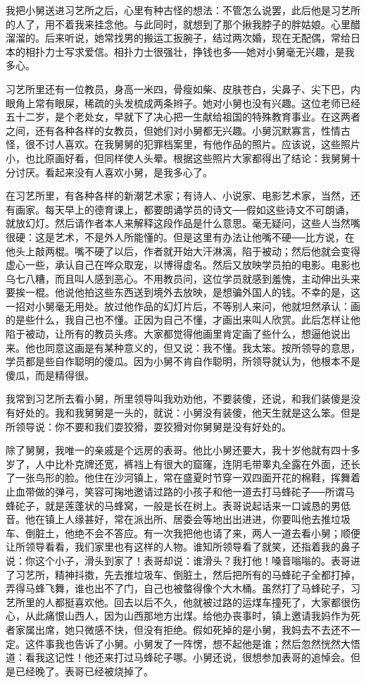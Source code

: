 我把小舅送进习艺所之后，心里有种古怪的想法：不管怎么说罢，此后他是习艺所的人了，用不着我来挂念他。与此同时，就想到了那个揪我脖子的胖姑娘。心里醋溜溜的。后来听说，她常找男的搬运工扳腕子，结过两次婚，现在无配偶，常给日本的相扑力士写求爱信。相扑力士很强壮，挣钱也多──她对小舅毫无兴趣，是我多心。 

习艺所里还有一位教员，身高一米四，骨瘦如柴、皮肤苍白，尖鼻子、尖下巴，内眼角上常有眼屎，稀疏的头发梳成两条辫子。她对小舅也没有兴趣。这位老师已经五十二岁，是个老处女，早就下了决心把一生献给祖国的特殊教育事业。在这两者之间，还有各种各样的女教员，但她们对小舅都无兴趣。小舅沉默寡言，性情古怪，很不讨人喜欢。在我舅舅的犯罪档案里，有他作品的照片。应该说，这些照片小，也比原画好看，但同样使人头晕。根据这些照片大家都得出了结论：我舅舅十分讨厌。看起来没有人喜欢小舅，是我多心了。 

在习艺所里，有各种各样的新潮艺术家；有诗人、小说家、电影艺术家，当然，还有画家。每天早上的德育课上，都要朗诵学员的诗文──假如这些诗文不可朗诵，就放幻灯。然后请作者本人来解释这段作品是什么意思。毫无疑问，这些人当然嘴很硬：这是艺术，不是外人所能懂的。但是这里有办法让他嘴不硬──比方说，在他头上敲两棍。嘴不硬了以后，作者就开始大汗淋漓，陷于被动；然后他就会变得虚心一些，承认自己在哗众取宠，以博得虚名。然后又放映学员拍的电影。电影也乌七八糟，而且叫人感到恶心。不用教员问，这位学员就感到羞愧，主动伸出头来要挨一棍。他说他拍这些东西送到境外去放映，是想骗外国人的钱。不幸的是，这一招对小舅毫无用处。放过他作品的幻灯片后，不等别人来问，他就坦然承认：画的是些什么，我自己也不懂。正因为自己不懂，才画出来叫人欣赏。此后怎样让他陷于被动，让所有的教员头疼。大家都觉得他画里肯定画了些什么，想逼他说出来。他也同意这画是有某种意义的，但又说：我不懂。我太笨。按所领导的意思，学员都是些自作聪明的傻瓜。因为小舅不肯自作聪明，所领导就认为，他根本不是傻瓜，而是精得很。 

我常到习艺所去看小舅，所里领导叫我劝劝他，不要装傻，还说，和我们装傻是没有好处的。我和我舅舅是一头的，就说：小舅没有装傻，他天生就是这么笨。但是所领导说：你不要和我们耍狡猾，耍狡猾对你舅舅是没有好处的。 

除了舅舅，我唯一的亲戚是个远房的表哥。他比小舅还要大，我十岁他就有四十多岁了，人中比朴克牌还宽，裤裆上有很大的窟窿，连阴毛带睾丸全露在外面，还长了一张鸟形的脸。他住在沙河镇上，常在盛夏时节穿一双四面开花的棉鞋，挥舞着止血带做的弹弓，笑容可掬地邀请过路的小孩子和他一道去打马蜂砣子──所谓马蜂砣子，就是莲蓬状的马蜂窝，一般是长在树上。表哥说起话来一口诚恳的男低音。他在镇上人缘甚好，常在派出所、居委会等地出出进进，你要叫他去推垃圾车、倒脏土，他绝不会不答应。有一次我把他也请了来，两人一道去看小舅；顺便让所领导看看，我们家里也有这样的人物。谁知所领导看了就笑，还指着我的鼻子说：你这个小子，滑头到家了！表哥却说：谁滑头？我打他！嗓音嗡嗡的。表哥进了习艺所，精神抖擞，先去推垃圾车、倒脏土，然后把所有的马蜂砣子全都打掉，弄得马蜂飞舞，谁也出不了门，自己也被螫得像个大木桶。虽然打了马蜂砣子，习艺所里的人都挺喜欢他。回去以后不久，他就被过路的运煤车撞死了，大家都很伤心，从此痛恨山西人，因为山西那地方出煤。给他办丧事时，镇上邀请我妈作为死者家属出席，她只微感不快，但没有拒绝。假如死掉的是小舅，我妈去不去还不一定。这件事我也告诉了小舅。小舅发了一阵愣，想不起他是谁；然后忽然恍然大悟道：看我这记性！他还来打过马蜂砣子哪。小舅还说，很想参加表哥的追悼会。但是已经晚了。表哥已经被烧掉了。 

